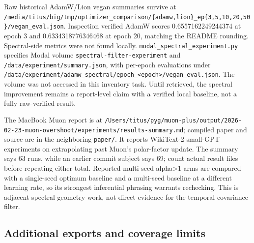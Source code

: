 \documentclass[
  british,
  10pt,
  a4paper,
]{article}
\begin{document}
Raw historical AdamW/Lion vegan summaries survive at
\texttt{/\allowbreak{}media/\allowbreak{}titus/\allowbreak{}big/\allowbreak{}tmp/\allowbreak{}optimizer\_\allowbreak{}comparison/\allowbreak{}\{\allowbreak{}adamw,\allowbreak{}lion\}\allowbreak{}\_\allowbreak{}ep\{\allowbreak{}3,\allowbreak{}5,\allowbreak{}10,\allowbreak{}20,\allowbreak{}50\}\allowbreak{}/\allowbreak{}vegan\_\allowbreak{}eval.\allowbreak{}json}.
Inspection verified AdamW scores
0.\allowbreak{}655716224924\allowbreak{}4374 at epoch 3 and
0.\allowbreak{}633431877634\allowbreak{}6468 at epoch 20, matching the
README rounding. Spectral-\allowbreak{}side metrics were not found
locally.
\texttt{modal\_\allowbreak{}spectral\_\allowbreak{}experiment.\allowbreak{}py}
specifies Modal volume
\texttt{spectral-\allowbreak{}filter-\allowbreak{}experiment} and
\texttt{/\allowbreak{}data/\allowbreak{}experiment/\allowbreak{}summary.\allowbreak{}json},
with per-epoch evaluations under
\texttt{/\allowbreak{}data/\allowbreak{}experiment/\allowbreak{}adamw\_\allowbreak{}spectral/\allowbreak{}epoch\_\allowbreak{}<epoch>/\allowbreak{}vegan\_\allowbreak{}eval.\allowbreak{}json}.
The volume was not accessed in this inventory task. Until retrieved, the
spectral improvement remains a report-\allowbreak{}level claim with a
verified local baseline, not a fully raw-\allowbreak{}verified result.

The MacBook Muon report is at
\texttt{/\allowbreak{}Users/\allowbreak{}titus/\allowbreak{}pyg/\allowbreak{}muon-\allowbreak{}plus/\allowbreak{}output/\allowbreak{}2026-\allowbreak{}02-\allowbreak{}23-\allowbreak{}muon-\allowbreak{}overshoot/\allowbreak{}experiments/\allowbreak{}results-\allowbreak{}summary.\allowbreak{}md};
compiled paper and source are in the neighboring \texttt{paper/}. It
reports WikiText-2 small-GPT experiments on extrapolating past Muon's
polar-\allowbreak{}factor update. The summary says 63 runs, while an
earlier commit subject says 69; count actual result files before
repeating either total. Reported multi-seed alpha\textgreater1 arms are
compared with a single-\allowbreak{}seed optimum baseline and a
multi-seed baseline at a different learning rate, so its strongest
inferential phrasing warrants rechecking.\allowbreak{} This is adjacent
spectral-\allowbreak{}geometry work, not direct evidence for the
temporal covariance filter.

\subsection{Additional exports and coverage
limits}\label{repository-inventory--additional-exports-and-coverage-limits}
\end{document}

